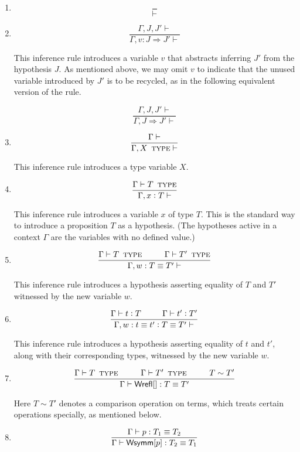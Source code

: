 \documentclass[11pt]{article}
\newcommand{\eqd}{\equiv}
\newcommand\spc{{\hskip 26pt}}
\newcommand{\ccolon}{\vcentcolon}
\newcommand{\TYPE}{\mathop{\text{ \sc type}}}
\newcommand{\Okay}{\mathop{\text{ \sc okay}}}
\newcommand{\Context}{\vdash\Okay}
\renewcommand{\Context}{\vdash}
\newcommand{\ha}[2]{#1[#2]}
\newcommand{\Wrefl}{{\sf Wrefl}}
\newcommand{\Wsymm}{{\sf Wsymm}}
\begin{document}
\begin{enumerate}

\item
$$\frac{}{\Context}$$

\item
$$\frac{\Gamma,J,J'\Context}{\Gamma,v : J \Rightarrow J' \Context}$$

This inference rule introduces a variable $v$ that abstracts inferring $J'$ from the hypothesis $J$.
As mentioned above, we may omit $v$ to indicate that the unused variable introduced by $J'$ is to be recycled, as 
in the following equivalent version of the rule.

$$\frac{\Gamma,J,J'\Context}{\Gamma,J \Rightarrow J' \Context}$$

\item
$$\frac{\Gamma\Context}{\Gamma, X \TYPE \Context}$$

This inference rule introduces a type variable $X$.

\item
$$\frac{\Gamma \vdash T \TYPE}{\Gamma, x \ccolon T \Context}$$

This inference rule introduces a variable $x$ of type $T$.  This is the
standard way to introduce a proposition $T$ as a hypothesis.  (The hypotheses
active in a context $\Gamma$ are the variables with no defined value.)

\item
$$\frac{
  \Gamma \vdash T \TYPE  
  \spc
  \Gamma \vdash T' \TYPE }
{\Gamma, w : T \eqd T' \Context}$$

This inference rule introduces a hypothesis asserting equality of $T$ and $T'$ witnessed
by the new variable $w$.

\item
  \[\frac{
  \Gamma \vdash t \ccolon T
  \spc
  \Gamma \vdash t' \ccolon T'
  } {
  \Gamma, w : t \eqd t' \ccolon T \eqd T' \Context}\]

This inference rule introduces a hypothesis asserting equality of $t$ and $t'$, along
with their corresponding types, witnessed by the new variable $w$.

\item 
\[\frac{\Gamma \vdash T \TYPE \spc \Gamma \vdash T' \TYPE
  \spc T\sim T'}{
  \Gamma \vdash \ha\Wrefl{}: T\eqd T' 
}
\]

Here $T\sim T'$ denotes a comparison operation on terms, which treats certain
operations specially, as mentioned below.

\item 
$$\frac{\Gamma \vdash p:T_1\eqd T_2 }{\Gamma \vdash \ha\Wsymm{p}:T_2\eqd T_1}$$


\end{enumerate}
\end{document}
